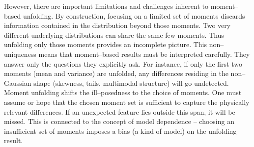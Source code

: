         However, there are important limitations and challenges inherent to moment--based unfolding.
        By construction, focusing on a limited set of moments discards information contained in the distribution beyond those moments.
        Two very different underlying distributions can share the same few moments.
        Thus unfolding only those moments provides an incomplete picture.
        This non--uniqueness means that moment--based results must be interpreted carefully.
        They answer only the questions they explicitly ask.
        For instance, if only the first two moments (mean and variance) are unfolded, any differences residing in the non--Gaussian shape (skewness, tails, multimodal structure) will go undetected.
        Moment unfolding shifts the ill--posedness to the choice of moments.
        One must assume or hope that the chosen moment set is sufficient to capture the physically relevant differences.
        If an unexpected feature lies outside this span, it will be missed.
        This is connected to the concept of model dependence – choosing an insufficient set of moments imposes a bias (a kind of model) on the unfolding result.

